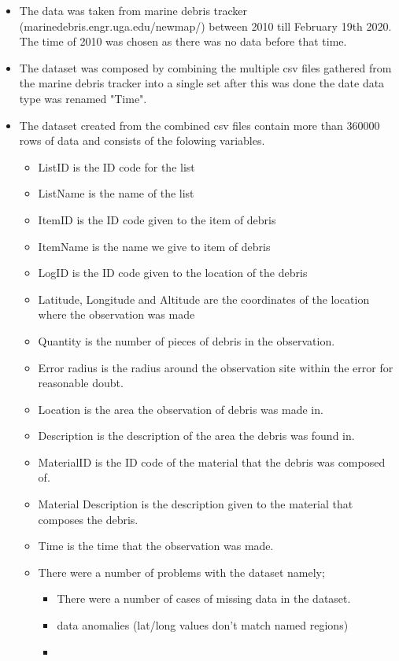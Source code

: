 \documentclass[10pt]{article}
\begin{document}
\begin{itemize}

\item The data was taken from marine debris tracker (marinedebris.engr.uga.edu/newmap/) between 2010 till February 19th 2020. The time of 2010 was chosen as there was no data before that time.
\item The dataset was composed by combining the multiple csv files gathered from the marine debris tracker into a single set after this was done the date data type was renamed "Time". 
\item The dataset created from the combined csv files contain more than 360000 rows of data and consists of the folowing variables.
  \begin{itemize}
  \item ListID is the ID code for the list
  \item ListName is the name of the list
  \item ItemID is the ID code given to the item of debris
  \item ItemName is the name we give to item of debris
  \item LogID is the ID code given to the location of the debris
  \item Latitude, Longitude and Altitude are the coordinates of the location where the observation was made
  \item Quantity is the number of pieces of debris in the observation.
  \item Error radius is the radius around the observation site within the error for reasonable doubt.
  \item Location is the area the observation of debris was made in.
  \item Description is the description of the area the debris was found in.
  \item MaterialID is the ID code of the material that the debris was composed of. 
  \item Material Description is the description given to the material that composes the debris.
  \item Time is the time that the observation was made. 
\item There were a number of problems with the dataset namely;
  \begin{itemize}
  \item There were a number of cases of missing data in the dataset. 
  \item data anomalies (lat/long values don't match named regions)
  \item 
  \end{itemize}
\end{itemize}



\end{itemize}
\end{document}
